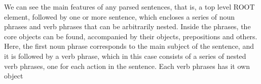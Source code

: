 We can see the main features of any parsed sentences, that is, a top level ROOT element, followed by one or more sentence, which encloses a series of noun phrases and verb phrases that can be arbitrarily nested. Inside the phrases, the core objects can be found, accompanied by their objects, prepositions and others. Here, the first noun phrase corresponds to the main subject of the sentence, and it is followed by a verb phrase, which in this case consists of a series of nested verb phrases, one for each action in the sentence. Each verb phrases has it own object




